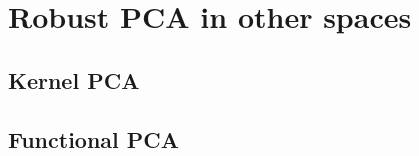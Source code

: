 \section{Robust PCA in other spaces}
\label{section:Others}

\subsection{Kernel PCA}

\subsection{Functional PCA}
